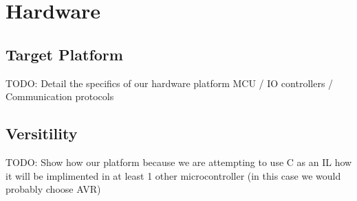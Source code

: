 \documentclass[final,12pt,twoside]{mcthesis}
\begin{document}
\chapter{Hardware}
\section{Target Platform}
TODO: Detail the specifics of our hardware platform MCU / IO controllers / Communication protocols
\section{Versitility}
TODO: Show how our platform because we are attempting to use C as an IL how it will be implimented in at least 1 other microcontroller (in this case we would probably choose AVR)




%
\label{body end}
\end{document}
